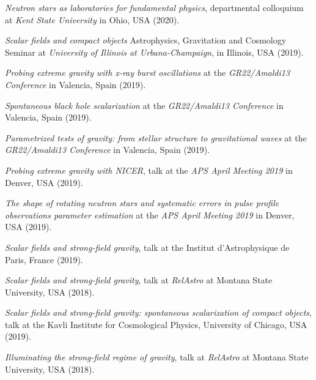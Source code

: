 \documentclass[10pt]{article}
\newcommand{\invited}{{\color{aeilbl}{invited}}}
\begin{document}
\begin{bibenum}
    \item
    \emph{Neutron stars as laboratories for fundamental physics},
    \invited{} departmental colloquium at \emph{Kent State University}
    in Ohio, USA (2020).

    \item
    \emph{Scalar fields and compact objects}
    Astrophysics, Gravitation and Cosmology Seminar at \emph{University of Illinois at Urbana-Champaign},
    in Illinois, USA (2019).

    \item
    \emph{Probing extreme gravity with x-ray burst oscillations}
    at the \emph{GR22/Amaldi13 Conference}
    in Valencia, Spain (2019).

    \item
    \emph{Spontaneous black hole scalarization}
    at the \emph{GR22/Amaldi13 Conference}
    in Valencia, Spain (2019).

    \item
    \emph{Parametrized tests of gravity: from stellar structure to gravitational waves}
    at the \emph{GR22/Amaldi13 Conference}
    in Valencia, Spain (2019).

    \item
    \emph{Probing extreme gravity with NICER},
    \invited{} talk at the \emph{APS April Meeting 2019}
    in Denver, USA (2019).

    \item
    \emph{The shape of rotating neutron stars and systematic errors
          in pulse profile observations parameter estimation}
    at the \emph{APS April Meeting 2019}
    in Denver, USA (2019).

    \item
    \emph{Scalar fields and strong-field gravity},
    \invited{} talk at the Institut d'Astrophysique de Paris, France (2019).

    \item
    \emph{Scalar fields and strong-field gravity},
    talk at \emph{RelAstro} at Montana State University, USA (2018).

	\item
    \emph{Scalar fields and strong-field gravity: spontaneous scalarization of compact objects},
    \invited{} talk at the Kavli Institute for Cosmological Physics, University of Chicago, USA (2019).

    \item
    \emph{Illuminating the strong-field regime of gravity},
    talk at \emph{RelAstro} at Montana State University, USA (2018).


\end{bibenum}
\end{document}
